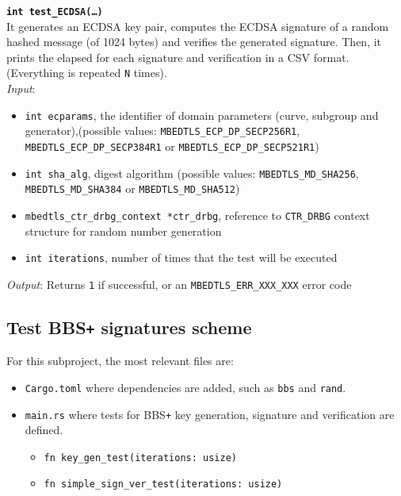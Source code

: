 \noindent
\texttt{\bfseries int test\_ECDSA(\dots)}\\
It generates an ECDSA key pair, computes the ECDSA signature of a random hashed message (of 1024 bytes) and verifies the generated signature. Then, it prints the elapsed for each signature and verification in a CSV format. (Everything is repeated \texttt{N} times). \\
\textit{Input}:
\begin{itemize}[noitemsep,nolistsep]
  \item \texttt{int ecparams}, the identifier of domain parameters (curve, subgroup and generator),(possible values: \texttt{MBEDTLS\_ECP\_DP\_SECP256R1}, \texttt{MBEDTLS\_ECP\_DP\_SECP384R1} or \texttt{MBEDTLS\_ECP\_DP\_SECP521R1})
  \item \texttt{int sha\_alg}, digest algorithm (possible values: \texttt{MBEDTLS\_MD\_SHA256}, \texttt{MBEDTLS\_MD\_SHA384} or \texttt{MBEDTLS\_MD\_SHA512})
  \item \texttt{mbedtls\_ctr\_drbg\_context *ctr\_drbg}, reference to \texttt{CTR\_DRBG} context structure for random number generation
  \item \texttt{int iterations}, number of times that the test will be executed
\end{itemize}
\textit{Output}:  Returns \texttt{1} if successful, or an \texttt{MBEDTLS\_ERR\_XXX\_XXX} error code


\subsection{Test BBS\texttt{+} signatures scheme}
For this subproject, the most relevant files are:
\begin{itemize}
  \item \texttt{Cargo.toml} where dependencies are added, such as  
  \texttt{bbs} and \texttt{rand}. 
  \item \texttt{main.rs} where tests for BBS\texttt{+} key generation, signature and verification are defined. 
  \begin{itemize} 
    \item \texttt{fn key\_gen\_test(iterations: usize)}
    \item \texttt{fn simple\_sign\_ver\_test(iterations: usize)}
  \end{itemize}
\end{itemize}

